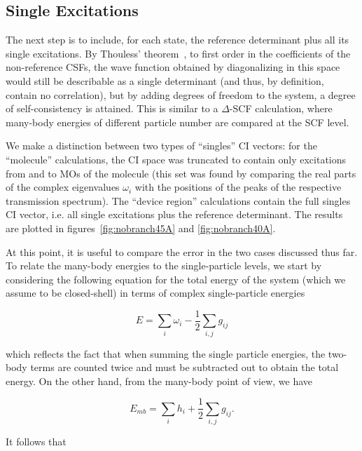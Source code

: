 \subsection{Single Excitations}
\label{subsec:singles}

The next step is to include, for each state, the reference determinant plus all
its single excitations. By Thouless' theorem~\cite{Thouless}, to first order in
the coefficients of the non-reference \acp{CSF}, the wave function obtained by
diagonalizing in this space would still be describable as a single determinant
(and thus, by definition, contain no correlation), but by adding degrees of
freedom to the system, a degree of self-consistency is attained. This is similar
to a $\Delta$-SCF calculation, where many-body energies of different particle
number are compared at the SCF level.

We make a distinction between two types of ``singles'' \ac{CI} vectors: for the
``molecule'' calculations, the \ac{CI} space was truncated to contain only
excitations from and to MOs of the molecule (this set was found by comparing
the real parts of the complex eigenvalues $\omega_i$ with the positions of the
peaks of the respective transmission spectrum). The ``device region''
calculations contain the full singles \ac{CI} vector, i.e. all single
excitations plus the reference determinant. The results are plotted in
figures~\ref{fig:nobranch45A} and \ref{fig:nobranch40A}.

At this point, it is useful to compare the error in the two cases discussed
thus far. To relate the many-body energies to the single-particle levels, we
start by considering the following equation for the total energy of the system
(which we assume to be closed-shell) in terms of complex single-particle
energies

\begin{equation}
	E = \sum_i \omega_i - \frac{1}{2} \sum_{i,j} g_{ij}
	\label{eq:sptotalenergy}
\end{equation}

which reflects the fact that when summing the single particle energies, the
two-body terms are counted twice and must be subtracted out to obtain the total
energy. On the other hand, from the many-body point of view, we have

\begin{equation}
	E_{mb} = \sum_i h_i + \frac{1}{2} \sum_{i,j} g_{ij}.
	\label{eq:mbtotalenergy}
\end{equation}

It follows that

